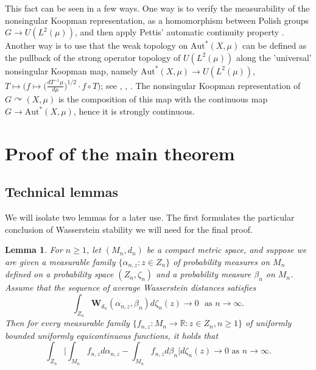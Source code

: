 \documentclass{amsart}
\providecommand{\lemmaname}{Lemma}
\numberwithin{equation}{subsection}
\theoremstyle{plain}
\newtheorem{lem}[lem]{\protect\lemmaname}
\theoremstyle{definition}
\theoremstyle{plain}
\begin{document}
This fact can be seen in a few ways. One way is to verify the measurability of the nonsingular Koopman representation, as a homomorphism between Polish groups \(G\to U\left(L^{2}\left(\mu\right)\right)\), and then apply Pettis' automatic continuity property \cite[\S9.C]{kechris2012descriptive}. Another way is to use that the weak topology on \(\mathrm{Aut}^{\ast}\left(X,\mu\right)\) can be defined as the pullback of the strong operator topology of \(U\left(L^{2}\left(\mu\right)\right)\) along the 'universal' nonsingular Koopman map, namely \(\mathrm{Aut}^{\ast}\left(X,\mu\right)\to U\left(L^{2}\left(\mu\right)\right)\), \(T\mapsto\big(f\mapsto\big(\tfrac{dT^{-1}\mu}{d\mu}\big)^{1/2}\cdot f\circ T\big)\); see \cite[\S1]{danilenko1995topological}, \cite[\S4.1]{giordano2007some}, \cite[Ex.~(17.46)]{kechris2012descriptive}. The nonsingular Koopman representation of \(G\curvearrowright\left(X,\mu\right)\) is the composition of this map with the continuous map \(G\to\mathrm{Aut}^{\ast}\left(X,\mu\right)\), hence it is strongly continuous.

\section{Proof of the main theorem}\label{sct:proof-main-theorem}

\subsection{Technical lemmas}

We will isolate two lemmas for a later use. The first formulates the particular conclusion of Wasserstein stability we will need for the final proof.

\begin{lem}\label{lem:Wassfinal}
For \(n\geq 1\), let \(\left(M_{n},d_{n}\right)\) be a compact metric space, and suppose we are given a measurable family \(\{\alpha_{n,z}:z\in Z_{n}\}\) of probability measures on \(M_{n}\) defined on a probability space \(\left(Z_{n},\zeta_{n}\right)\) and a probability measure \(\beta_{n}\) on \(M_{n}\). Assume that the sequence of average Wasserstein distances satisfies
\[\int_{Z_{n}}\mathbf{W}_{d_{n}}\left(\alpha_{n,z},\beta_{n}\right)d\zeta_{n}\left(z\right)\to0\,\,\text{ as}\,\, n\to\infty.\]
Then for every measurable family \(\{f_{n,z}:M_{n}\to\mathbb{R}:z\in Z_{n},n\geq1\}\) of uniformly bounded uniformly equicontinuous functions, it holds that
\[\int_{Z_{n}}\Big|\int_{M_{n}}f_{n,z}d\alpha_{n,z}-\int_{M_{n}}f_{n,z}d\beta_{n}\Big|d\zeta_{n}\left(z\right)\to0\text{ as }n\to\infty.\]
\end{lem}
\end{document}
